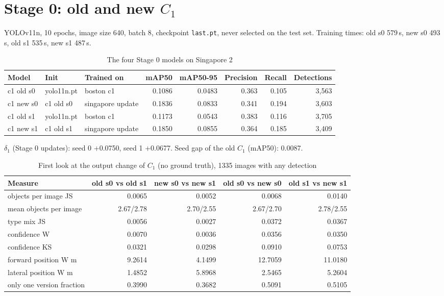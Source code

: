 \documentclass[10pt,a4paper]{article}
\begin{document}
\section{Stage 0: old and new $C_1$}
YOLOv11n, 10 epochs, image size 640, batch 8, checkpoint \texttt{last.pt}, never selected on the test set.
Training times: old s0 579\,s, new s0 493\,s, old s1 535\,s, new s1 487\,s.
\begin{table}[h]\centering\small\caption{The four Stage 0 models on Singapore 2}
\begin{tabular}{lllrrrrr}\toprule
Model & Init & Trained on & mAP50 & mAP50-95 & Precision & Recall & Detections\\\midrule
c1 old s0 & yolo11n.pt & boston c1 & 0.1086 & 0.0483 & 0.363 & 0.105 & 3,563\\
c1 new s0 & c1 old s0 & singapore update & 0.1836 & 0.0833 & 0.341 & 0.194 & 3,603\\
c1 old s1 & yolo11n.pt & boston c1 & 0.1173 & 0.0543 & 0.383 & 0.116 & 3,705\\
c1 new s1 & c1 old s1 & singapore update & 0.1850 & 0.0855 & 0.364 & 0.185 & 3,409\\
\bottomrule\end{tabular}\end{table}
$\delta_1$ (Stage 0 updates): seed 0 +0.0750, seed 1 +0.0677. Seed gap of the old $C_1$ (mAP50): 0.0087.

\begin{table}[h]\centering\small\caption{First look at the output change of $C_1$ (no ground truth), 1335 images with any detection}
\begin{tabular}{lrrrr}\toprule
Measure & old s0 vs old s1 & new s0 vs new s1 & old s0 vs new s0 & old s1 vs new s1\\\midrule
objects per image JS & 0.0065 & 0.0052 & 0.0068 & 0.0140\\
mean objects per image & 2.67/2.78 & 2.70/2.55 & 2.67/2.70 & 2.78/2.55\\
type mix JS & 0.0056 & 0.0027 & 0.0372 & 0.0367\\
confidence W & 0.0070 & 0.0036 & 0.0356 & 0.0350\\
confidence KS & 0.0321 & 0.0298 & 0.0910 & 0.0753\\
forward position W m & 9.2614 & 4.1499 & 12.7059 & 11.0180\\
lateral position W m & 1.4852 & 5.8968 & 2.5465 & 5.2604\\
only one version fraction & 0.3990 & 0.3682 & 0.5091 & 0.5105\\
\bottomrule\end{tabular}\end{table}
\FloatBarrier
\end{document}
